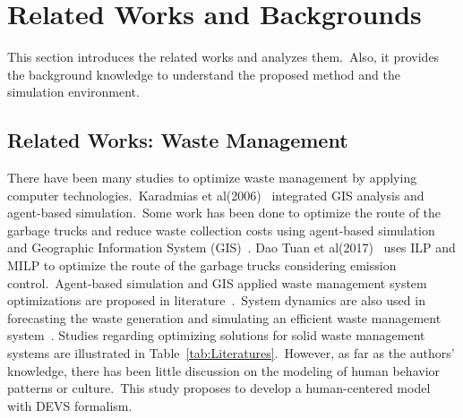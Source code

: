 \documentclass{scsSimAUDPaperFormat}
\begin{document}
\section{Related Works and Backgrounds}
This section introduces the related works and analyzes them.~Also, it provides the background knowledge to understand the proposed method and the simulation environment.

\subsection{Related Works: Waste Management}
There have been many studies to optimize waste management by applying computer technologies.~Karadmias et al(2006)~\cite{karadimas2006coupling} integrated GIS analysis and agent-based simulation.~Some work has been done to optimize the route of the garbage trucks and reduce waste collection costs using agent-based simulation and Geographic Information System (GIS)~\cite{chalkias2009gis,das2015optimization,nambiar2013multi,nguyenemission,shi2013multi}.
Dao Tuan et al(2017)~\cite{dao2017optimizing} uses ILP and MILP to optimize the route of the garbage trucks considering emission control.~Agent-based simulation and GIS applied waste management system optimizations are proposed in literature~\cite{karadimas2006coupling,shi2013multi,nguyenemission,nambiar2013multi,hua2016towards}.~System dynamics are also used in forecasting the waste generation and simulating an efficient waste management system~\cite{guariso2009modelling,dyson2005forecasting,wang2017system}. Studies regarding optimizing solutions for solid waste management systems are illustrated in Table~\ref{tab:Literatures}.~However, as far as the authors' knowledge, there has been little discussion on the modeling of human behavior patterns or culture.~This study proposes to develop a human-centered model with DEVS formalism. 
\end{document}
